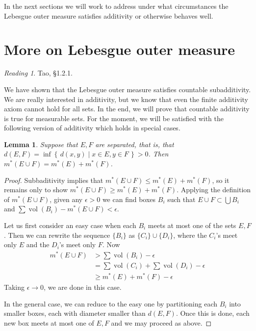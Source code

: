 \documentclass[11pt,oneside]{amsbook}
\newcommand{\set}[1]{\left\{\,#1\,\right\}}
\DeclareMathOperator{\vol}{vol}
\theoremstyle{definition}
\theoremstyle{plain}
\newtheorem{lem}[thm]{Lemma}
\theoremstyle{definition}
\theoremstyle{remark}
\newtheorem*{reading}{Reading}
\numberwithin{equation}{section}
\numberwithin{figure}{section}
\begin{document}
In the next sections we will work to address under what circumstances the Lebesgue outer measure satisfies additivity or otherwise behaves well.


\section{More on Lebesgue outer measure}

\begin{reading}
  Tao, \S 1.2.1.
\end{reading}

We have shown that the Lebesgue outer measure satisfies countable subadditivity. We are really interested in additivity, but we know that even the finite additivity axiom cannot hold for all sets. In the end, we will prove that countable additivity is true for measurable sets. For the moment, we will be satisfied with the following version of additivity which holds in special cases.


\begin{lem}
  Suppose that $E,F$ are separated, that is, that $d(E,F)=\inf\set{d(x,y)\mid x\in E, y\in F}>0$. Then $m^*(E\cup F)=m^*(E)+m^*(F)$.
\end{lem}

\begin{proof}
  Subbaditivity implies that $m^*(E\cup F)\leq m^*(E)+m^*(F)$, so it remains only to show $m^*(E\cup F)\geq m^*(E)+m^*(F)$. Applying the definition of $m^*(E\cup F)$, given any $\epsilon>0$ we can find boxes $B_i$ such that $E\cup F\subset\bigcup B_i$ and $\sum\vol(B_i)-m^*(E\cup F)<\epsilon$.

  Let us first consider an easy case when each $B_i$ meets at most one of the sets $E,F$. Then we can rewrite the sequence $\{B_i\}$ as $\{C_i\}\cup\{D_i\}$, where the $C_i$'s meet only $E$ and the $D_i$'s meet only $F$. Now
  \begin{align*}
    m^*(E\cup F)&>\sum\vol(B_i)-\epsilon\\
                &=\sum\vol(C_i)+\sum\vol(D_i)-\epsilon\\
                &\geq m^*(E)+m^*(F)-\epsilon
  \end{align*}
  Taking $\epsilon\to0$, we are done in this case.

  In the general case, we can reduce to the easy one by partitioning each $B_i$ into smaller boxes, each with diameter smaller than $d(E,F)$. Once this is done, each new box meets at most one of $E,F$ and we may proceed as above.
\end{proof}
\end{document}
